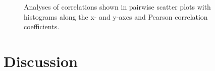 \documentclass[paper=A4,bibliography=totocnumbered]{scrartcl}
\begin{document}
\begin{figure}
	\centering
	\qquad
	\qquad
	\caption{Analyses of correlations shown in pairwise scatter plots with histograms along the x- and y-axes and Pearson correlation coefficients.}
	\label{fig:corr}
\end{figure}

\clearpage
\section{Discussion}
\end{document}
